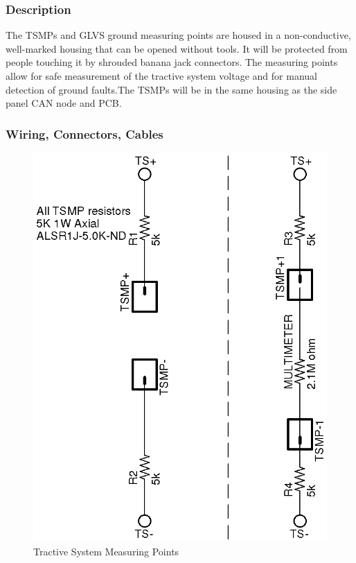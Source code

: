 \documentclass{article}
\begin{document}
        \subsubsection{Description}


            The TSMPs and GLVS ground measuring points are housed in a non-conductive, well-marked housing that can be opened without tools. It will be protected from people touching it by shrouded banana jack connectors. The measuring points allow for safe measurement of the tractive system voltage and for manual detection of ground faults.The TSMPs will be in the same housing as the side panel CAN node and PCB.

        \subsubsection{Wiring, Connectors, Cables}

            \begin{figure}[H]
                \centering
                \includegraphics{TSMP}
                \caption{Tractive System Measuring Points}
                \label{fig:TSMPschematic}
            \end{figure}
\end{document}
